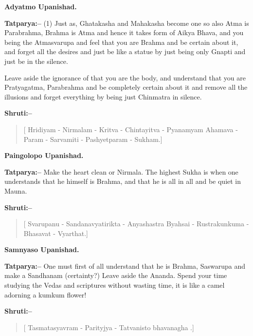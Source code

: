 \begin{flushright}
\textbf{Adyatmo Upanishad.}
\end{flushright}

\textbf{Tatparya:–} (1) Just as, Ghatakasha and Mahakasha become one so also Atma is Parabrahma, Brahma is Atma and hence it takes form of Aikya Bhava, and you being the Atmasvarupa and feel that you are Brahma and be certain about it, and forget all the desires and just be like a statue by just being only Gnapti and just be in the silence.

Leave aside the ignorance of that you are the body, and understand that you are Pratyagatma, Parabrahma and be completely certain about it and remove all the illusions and forget everything by being just Chinmatra in silence.

\textbf{Shruti:–}

\begin{verse}
[ Hridiyam - Nirmalam - Kritva - Chintayitva - Pyana\break myam  Ahamava - Param - Sarvamiti - Pashyetparam - Sukham.]
\end{verse}

\begin{flushright}
\textbf{Paingolopo Upanishad.}
\end{flushright}

\textbf{Tatparya:–} Make the heart clean or Nirmala. The highest Sukha is when one understands that he himself is Brahma, and that he is all in all and be quiet in Mauna.

\textbf{Shruti:–}

\begin{verse}
[ Svarupanu - Sandanavyatirikta - Anyashastra Byahsai - Rustrakunkuma - Bhasavat - Vyarthat.]
\end{verse}

\begin{flushright}
\textbf{Samnyaso Upanishad.}
\end{flushright}

\textbf{Tatparya:–} One must first of all understand that he is Brahma, Saswarupa and make a Sandhanam (certainty?) Leave aside the Ananda. Spend your time studying the Vedas and scriptures without wasting time, it is like a camel adorning a kumkum flower!

\textbf{Shruti:–}

\begin{verse}
[ Tasmatasyavram - Parityjya - Tatvanisto bhavanagha .]
\end{verse}

